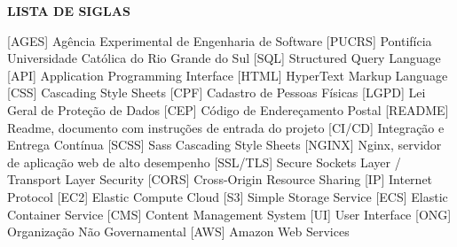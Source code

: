 
\begin{center}
  \uppercase{\bfseries lista de siglas}\\[3em]
\end{center}

\begin{acronym}[XXXXXXXX]
   [AGES] {Agência Experimental de Engenharia de Software}
   [PUCRS] {Pontifícia Universidade Católica do Rio Grande do Sul}
   [SQL] {Structured Query Language}
   [API] {Application Programming Interface}
   [HTML] {HyperText Markup Language}
   [CSS] {Cascading Style Sheets}
   [CPF] {Cadastro de Pessoas Físicas}
   [LGPD] {Lei Geral de Proteção de Dados}
   [CEP] {Código de Endereçamento Postal}
   [README] {Readme, documento com instruções de entrada do projeto}
   [CI/CD] {Integração e Entrega Contínua}
   [SCSS] {Sass Cascading Style Sheets}
   [NGINX] {Nginx, servidor de aplicação web de alto desempenho}
   [SSL/TLS] {Secure Sockets Layer / Transport Layer Security}
   [CORS] {Cross-Origin Resource Sharing}
   [IP] {Internet Protocol}
   [EC2] {Elastic Compute Cloud}
   [S3] {Simple Storage Service}
   [ECS] {Elastic Container Service}
   [CMS] {Content Management System}
   [UI] {User Interface}
   [ONG] {Organização Não Governamental}
   [AWS] {Amazon Web Services}
\end{acronym}

